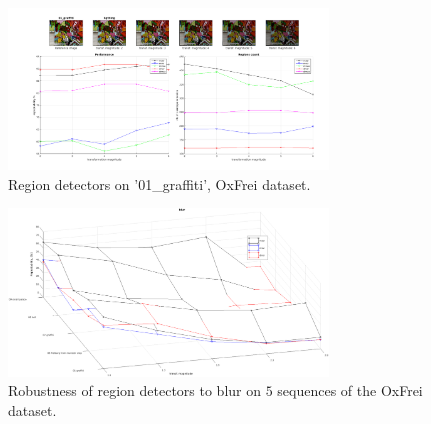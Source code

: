 \documentclass{article}
\begin{document}
\begin{figure}[htb]
\centering
\begin{minipage}[b]{.99\linewidth}
  \centering
 \centerline{\includegraphics[width=8.5cm]{./Figs/repeatability_all_combined_01_graffiti_ligthing_good}}
\end{minipage}
\hfill
\caption{Region detectors on '01\_graffiti', OxFrei dataset.}
\label{fig:det_frei}
%
\end{figure}

\begin{figure}[htb]

\begin{minipage}[b]{.9\linewidth}
  \centering
  \centerline{\includegraphics[width=8.5cm]{./Figs/blur_some_combined}}
\end{minipage}
\hfill
\caption{Robustness of region detectors to blur on $5$ sequences of the OxFrei dataset.}
\label{fig:blur}
%
\end{figure}
\end{document}
